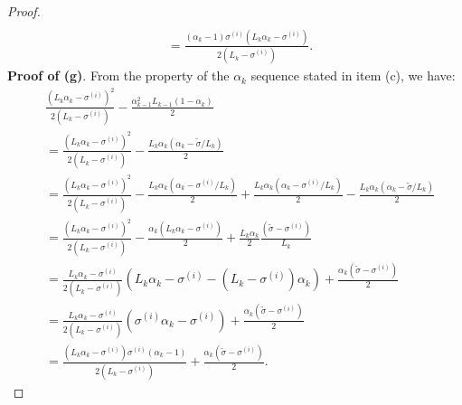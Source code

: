 \documentclass[12pt]{article}
\begin{document}
\begin{proof}
{\begin{align*}
            \\
            &= \frac{(\alpha_k - 1)\sigma^{(i)}\left(L_k\alpha_k - \sigma^{(i)}\right)}
            {2\left(L_k - \sigma^{(i)}\right)}. 
        \end{align*}
        }    
        \textbf{Proof of (g)}.
        From the property of the $\alpha_k$ sequence stated in item (c), we have: 
        {\allowdisplaybreaks
        \begin{align*}
            &\frac{\left(
                L_k\alpha_k - \sigma^{(i)}
            \right)^2}{2(L_k - \sigma^{(i)})} 
            -
            \frac{\alpha_{k - 1}^2L_{k - 1}(1 - \alpha_k)}{2} 
            \\
            &= 
            \frac{\left(
                L_k\alpha_k - \sigma^{(i)}
            \right)^2}{2(L_k - \sigma^{(i)})} 
            -
            \frac{L_k\alpha_k(\alpha_k - \tilde \sigma/L_k)}{2} 
            \\
            &=
            \frac{\left(
                L_k\alpha_k - \sigma^{(i)}
            \right)^2}{2(L_k - \sigma^{(i)})} 
            - \frac{L_k\alpha_k(\alpha_k - \sigma^{(i)}/L_k)}{2}
            + \frac{L_k\alpha_k(\alpha_k - \sigma^{(i)}/L_k)}{2} 
            - \frac{L_k\alpha_k(\alpha_k - \tilde \sigma/L_k)}{2} 
            \\
            &= 
            \frac{\left(
                L_k\alpha_k - \sigma^{(i)}
            \right)^2}{2(L_k - \sigma^{(i)})} 
            - \frac{\alpha_k\left(L_k\alpha_k - \sigma^{(i)}\right)}{2}
            + \frac{L_k\alpha_k}{2}
            \frac{\left(
                \tilde \sigma - \sigma^{(i)}
            \right)}{L_k}
            \\
            &=
            \frac{L_k \alpha_k - \sigma^{(i)}}{2(L_k - \sigma^{(i)})}\left(
                L_k \alpha_k - \sigma^{(i)} 
                - \left(L_k - \sigma^{(i)}\right)\alpha_k
            \right)
            + \frac{\alpha_k(\tilde \sigma - \sigma^{(i)})}{2}
            \\
            &= \frac{L_k \alpha_k - \sigma^{(i)}}{2(L_k - \sigma^{(i)})}\left(
                \sigma^{(i)}\alpha_k - \sigma^{(i)} 
            \right)
            + \frac{\alpha_k(\tilde \sigma - \sigma^{(i)})}{2}
            \\
            &= 
            \frac{
                \left(L_k \alpha_k - \sigma^{(i)}\right)\sigma^{(i)}
                \left(\alpha_k - 1\right)
            }
            {2(L_k - \sigma^{(i)})}
            + \frac{\alpha_k(\tilde \sigma - \sigma^{(i)})}{2}. 
        \end{align*}   
        } 
    \end{proof}
\end{document}
